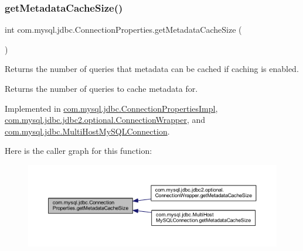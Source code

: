 \subsubsection{\texorpdfstring{get\+Metadata\+Cache\+Size()}{getMetadataCacheSize()}}
{\footnotesize\ttfamily int com.\+mysql.\+jdbc.\+Connection\+Properties.\+get\+Metadata\+Cache\+Size (\begin{DoxyParamCaption}{ }\end{DoxyParamCaption})}

Returns the number of queries that metadata can be cached if caching is enabled.

\begin{DoxyReturn}{Returns}
the number of queries to cache metadata for. 
\end{DoxyReturn}


Implemented in \mbox{\hyperlink{classcom_1_1mysql_1_1jdbc_1_1_connection_properties_impl_a00b9680cb788678725baa239019bc714}{com.\+mysql.\+jdbc.\+Connection\+Properties\+Impl}}, \mbox{\hyperlink{classcom_1_1mysql_1_1jdbc_1_1jdbc2_1_1optional_1_1_connection_wrapper_a0bb63d0913c6fafbbbb5cfdd3ba55521}{com.\+mysql.\+jdbc.\+jdbc2.\+optional.\+Connection\+Wrapper}}, and \mbox{\hyperlink{classcom_1_1mysql_1_1jdbc_1_1_multi_host_my_s_q_l_connection_a7e4ed369659b3dc767551e7491496cfa}{com.\+mysql.\+jdbc.\+Multi\+Host\+My\+S\+Q\+L\+Connection}}.

Here is the caller graph for this function\+:\nopagebreak
\begin{figure}[H]
\begin{center}
\leavevmode
\includegraphics[width=350pt]{interfacecom_1_1mysql_1_1jdbc_1_1_connection_properties_a980b503e0c8bf4b37a666526770ad043_icgraph}
\end{center}
\end{figure}
\mbox{\label{interfacecom_1_1mysql_1_1jdbc_1_1_connection_properties_aa2bc32d658c0dbe027280d159da5dd49}} 

